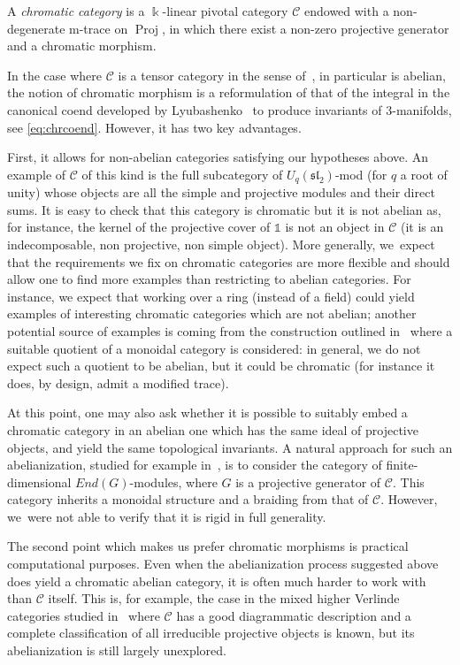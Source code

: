 \documentclass[pdftex]{sigma}
\numberwithin{equation}{section}
\newcommand{\Proj}{\operatorname{Proj}}
\numberwithin{theorem}{section}
\numberwithin{proposition}{section}
\numberwithin{definition}{section}
\numberwithin{lemma}{section}
\numberwithin{corollary}{section}
\numberwithin{remark}{section}
\numberwithin{example}{section}
\newcommand{\cat}{\mathcal{C}}
\newcommand{\unit}{\ensuremath{\mathds{1}}}
\newcommand{\FK}{{\Bbbk}}
\begin{document}
\begin{definition}%
 A \emph{chromatic
 category} is a $\FK$-linear pivotal category $\cat$ endowed with a
 non-degenerate m-trace on $\Proj$, in which there exist a non-zero
 projective generator and a chromatic morphism.
\end{definition}
\begin{remark}
In the case where $\cat$ is a tensor category in the sense of~\cite{EGNO}, in particular is abelian, the notion of chromatic morphism is a reformulation of that of the integral in the canonical coend developed by Lyubashenko~\cite{L94} to produce invariants of 3-manifolds, see \eqref{eq:chrcoend}. However, it has two key advantages.

First, it allows for non-abelian categories satisfying our hypotheses above.
An example of $\cat$ of this kind is the full subcategory of $U_q(\mathfrak{sl}_2)$-mod (for $q$ a root of unity) whose objects are all the simple and projective modules and their direct sums. It is easy to check that this category is chromatic but it is not abelian as, for instance, the kernel of the projective cover of $\unit$ is not an object in $\cat$ (it is an indecomposable, non projective, non simple object).
More generally,
we~expect that the requirements we fix on chromatic categories are
more flexible and should allow one to find more examples than
restricting to abelian categories. For instance, we expect that working
over a ring (instead of a field) could yield examples of interesting
chromatic categories which are not abelian; another potential source
of examples is coming from the construction outlined in~\cite[Theorem~4.2]{CGP22} where a suitable quotient of a monoidal category is
considered: in general, we do not expect such a quotient to be abelian,
but it could be chromatic (for instance it does, by design, admit a
modified trace).

At this point, one may also ask whether it is possible to suitably
embed a chromatic category in an abelian one which has the same ideal of projective objects, and yield the same topological invariants. A natural approach for such an abelianization, studied for example in~\cite{BEO23}, is to consider the category of finite-dimensional
$End(G)$-modules, where $G$ is a projective generator of $\cat$. This category inherits a monoidal structure and a braiding from that of $\cat$. However,
we~were not able to verify that it is rigid in full
generality.

The second point which makes us prefer chromatic morphisms is practical computational purposes. Even when the abelianization process suggested above does yield a chromatic abelian category, it is often much harder to work with than $\cat$ itself. This is, for example, the case in the mixed higher Verlinde categories studied in~\cite{Decoppet, DH2HB} where $\cat$ has a good diagrammatic description and a complete classification of all irreducible projective objects is known, but its abelianization is still largely unexplored.
\end{remark}
\end{document}

